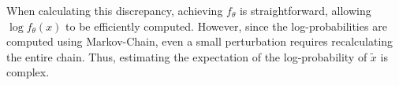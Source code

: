 
When calculating this discrepancy, achieving $f_\theta$ is straightforward, allowing $\log f_\theta(x)$ to be efficiently computed.
%
However, since the log-probabilities are computed using Markov-Chain, even a small perturbation requires recalculating the entire chain.
%
Thus, estimating the expectation of the log-probability of $\tilde{x}$ is complex.


